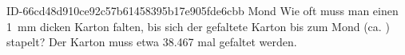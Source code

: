 \begin{exercise}
      {ID-66cd48d910ce92c57b61458395b17e905fde6cbb}
      {Mond}
  \ifproblem\problem
    Wie oft muss man einen \SI{1}{\milli\metre} dicken Karton falten,
    bis sich der gefaltete Karton bis zum Mond (ca. )
    stapelt?
  \fi
  \ifoutcome\outcome
    Der Karton muss etwa \num{38.467} mal gefaltet werden.
  \fi
\end{exercise}
